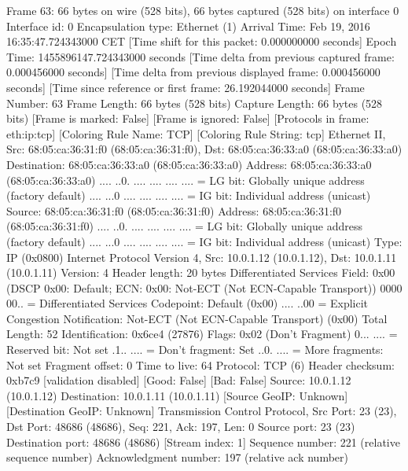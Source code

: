 Frame 63: 66 bytes on wire (528 bits), 66 bytes captured (528 bits) on interface 0
    Interface id: 0
    Encapsulation type: Ethernet (1)
    Arrival Time: Feb 19, 2016 16:35:47.724343000 CET
    [Time shift for this packet: 0.000000000 seconds]
    Epoch Time: 1455896147.724343000 seconds
    [Time delta from previous captured frame: 0.000456000 seconds]
    [Time delta from previous displayed frame: 0.000456000 seconds]
    [Time since reference or first frame: 26.192044000 seconds]
    Frame Number: 63
    Frame Length: 66 bytes (528 bits)
    Capture Length: 66 bytes (528 bits)
    [Frame is marked: False]
    [Frame is ignored: False]
    [Protocols in frame: eth:ip:tcp]
    [Coloring Rule Name: TCP]
    [Coloring Rule String: tcp]
Ethernet II, Src: 68:05:ca:36:31:f0 (68:05:ca:36:31:f0), Dst: 68:05:ca:36:33:a0 (68:05:ca:36:33:a0)
    Destination: 68:05:ca:36:33:a0 (68:05:ca:36:33:a0)
        Address: 68:05:ca:36:33:a0 (68:05:ca:36:33:a0)
        .... ..0. .... .... .... .... = LG bit: Globally unique address (factory default)
        .... ...0 .... .... .... .... = IG bit: Individual address (unicast)
    Source: 68:05:ca:36:31:f0 (68:05:ca:36:31:f0)
        Address: 68:05:ca:36:31:f0 (68:05:ca:36:31:f0)
        .... ..0. .... .... .... .... = LG bit: Globally unique address (factory default)
        .... ...0 .... .... .... .... = IG bit: Individual address (unicast)
    Type: IP (0x0800)
Internet Protocol Version 4, Src: 10.0.1.12 (10.0.1.12), Dst: 10.0.1.11 (10.0.1.11)
    Version: 4
    Header length: 20 bytes
    Differentiated Services Field: 0x00 (DSCP 0x00: Default; ECN: 0x00: Not-ECT (Not ECN-Capable Transport))
        0000 00.. = Differentiated Services Codepoint: Default (0x00)
        .... ..00 = Explicit Congestion Notification: Not-ECT (Not ECN-Capable Transport) (0x00)
    Total Length: 52
    Identification: 0x6ce4 (27876)
    Flags: 0x02 (Don't Fragment)
        0... .... = Reserved bit: Not set
        .1.. .... = Don't fragment: Set
        ..0. .... = More fragments: Not set
    Fragment offset: 0
    Time to live: 64
    Protocol: TCP (6)
    Header checksum: 0xb7c9 [validation disabled]
        [Good: False]
        [Bad: False]
    Source: 10.0.1.12 (10.0.1.12)
    Destination: 10.0.1.11 (10.0.1.11)
    [Source GeoIP: Unknown]
    [Destination GeoIP: Unknown]
Transmission Control Protocol, Src Port: 23 (23), Dst Port: 48686 (48686), Seq: 221, Ack: 197, Len: 0
    Source port: 23 (23)
    Destination port: 48686 (48686)
    [Stream index: 1]
    Sequence number: 221    (relative sequence number)
    Acknowledgment number: 197    (relative ack number)
